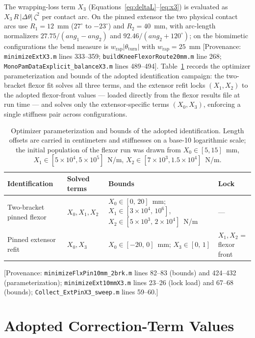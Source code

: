 The wrapping-loss term $X_{3}$ (Equations~\ref{eq:deltaL}--\ref{eq:x3}) is evaluated as $X_{3}\,R\,\lvert\Delta\theta\rvert\,\zeta^{2}$ per contact arc. On the pinned extensor the two physical contact arcs use $R_{1} = 12$~mm ($27^{\circ}$ to $-23^{\circ}$) and $R_{2} = 40$~mm, with arc-length normalizers $27.75/(ang_{1} - ang_{2})$ and $92.46/(ang_{2}+120^{\circ})$; on the biomimetic configurations the bend measure is $w_{\text{rap}}\lvert\theta_{\text{turn}}\rvert$ with $w_{\text{rap}} = 25$~mm [Provenance: \texttt{minimizeExtX3.m} lines 333--359; \texttt{buildKneeFlexorRoute20mm.m} line 268; \texttt{MonoPamDataExplicit\_balanceX3.m} lines 489--494]. Table~\ref{tab:app_opt_bounds} records the optimizer parameterization and bounds of the adopted identification campaign: the two-bracket flexor fit solves all three terms, and the extensor refit locks $(X_{1}, X_{2})$ to the adopted flexor-front values --- loaded directly from the flexor results file at run time --- and solves only the extensor-specific terms $(X_{0}, X_{3})$, enforcing a single stiffness pair across configurations.

\begin{table}[htbp]
\caption{Optimizer parameterization and bounds of the adopted identification. Length offsets are carried in centimeters and stiffnesses on a base-10 logarithmic scale; the initial population of the flexor run was drawn from $X_{0}\in[5,15]$~mm, $X_{1}\in[5\times10^{4}, 5\times10^{5}]$~N/m, $X_{2}\in[7\times10^{3}, 1.5\times10^{4}]$~N/m.}
\label{tab:app_opt_bounds}
\begin{tabular}{@{}llll@{}}
\toprule
\textbf{Identification} & \textbf{Solved terms} & \textbf{Bounds} & \textbf{Lock} \\
\midrule
Two-bracket pinned flexor & $X_{0}, X_{1}, X_{2}$ & $X_{0}\in[0,\,20]$~mm; $X_{1}\in[3\times10^{4},\,10^{6}]$, $X_{2}\in[5\times10^{3},\,2\times10^{4}]$~N/m & --- \\
Pinned extensor refit & $X_{0}, X_{3}$ & $X_{0}\in[-20,\,0]$~mm; $X_{3}\in[0,\,1]$ & $X_{1}, X_{2}$ = flexor front \\
\bottomrule
\end{tabular}
\end{table}

[Provenance: \texttt{minimizeFlxPin10mm\_2brk.m} lines 82--83 (bounds) and 424--432 (parameterization); \texttt{minimizeExt10mmX3.m} lines 23--26 (lock load) and 67--68 (bounds); \texttt{Collect\_ExtPinX3\_sweep.m} lines 59--60.]

\section{Adopted Correction-Term Values}

